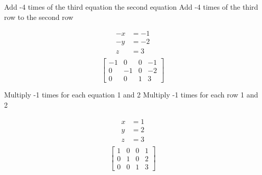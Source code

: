 \documentclass[a4paper, 12pt]{article}
\begin{document}
\begin{multicols}{2} 
Add -4 times of the third equation the second equation
\break
Add -4 times of the third row to the second row
\end{multicols}

\begin{multicols}{2}
\begin{align*}
-x &= -1 \\
-y &= -2 \\
z  &= 3\\
\end{align*}
\break
\[ \left[ {\begin{array}{cccc}
-1 & 0 & 0  & -1 \\
0 & -1 & 0 & -2 \\
0 & 0 & 1  & 3 
\end{array}} \right] \]
\end{multicols} 

\begin{multicols}{2} 
Multiply -1 times for each equation 1 and 2
\break
Multiply -1 times for each row 1 and 2
\end{multicols}


\begin{multicols}{2}
\begin{align*}
x &= 1 \\
y &= 2 \\
z  &= 3\\
\end{align*}
\break
\[ \left[ {\begin{array}{cccc}
1 & 0 & 0  & 1 \\
0 & 1 & 0 & 2 \\
0 & 0 & 1  & 3 
\end{array}} \right] \]
\end{multicols} 
\end{document}
